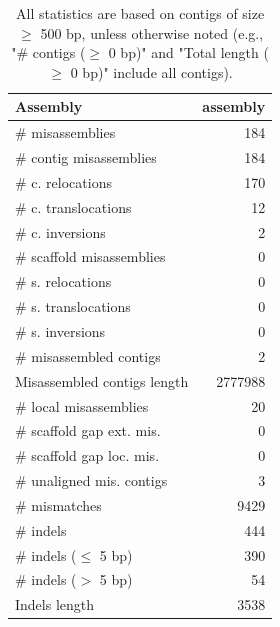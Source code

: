 \documentclass[12pt,a4paper]{article}
\begin{document}
\begin{table}[ht]
\begin{center}
\caption{All statistics are based on contigs of size $\geq$ 500 bp, unless otherwise noted (e.g., "\# contigs ($\geq$ 0 bp)" and "Total length ($\geq$ 0 bp)" include all contigs).}
\begin{tabular}{|l*{1}{|r}|}
\hline
Assembly & assembly \\ \hline
\# misassemblies & 184 \\ \hline
\hspace{2mm}\# contig misassemblies & 184 \\ \hline
\hspace{5mm}\# c. relocations & 170 \\ \hline
\hspace{5mm}\# c. translocations & 12 \\ \hline
\hspace{5mm}\# c. inversions & 2 \\ \hline
\hspace{2mm}\# scaffold misassemblies & 0 \\ \hline
\hspace{5mm}\# s. relocations & 0 \\ \hline
\hspace{5mm}\# s. translocations & 0 \\ \hline
\hspace{5mm}\# s. inversions & 0 \\ \hline
\# misassembled contigs & 2 \\ \hline
Misassembled contigs length & 2777988 \\ \hline
\# local misassemblies & 20 \\ \hline
\# scaffold gap ext. mis. & 0 \\ \hline
\# scaffold gap loc. mis. & 0 \\ \hline
\# unaligned mis. contigs & 3 \\ \hline
\# mismatches & 9429 \\ \hline
\# indels & 444 \\ \hline
\hspace{5mm}\# indels ($\leq$ 5 bp) & 390 \\ \hline
\hspace{5mm}\# indels ($>$ 5 bp) & 54 \\ \hline
Indels length & 3538 \\ \hline
\end{tabular}
\end{center}
\end{table}
\end{document}
